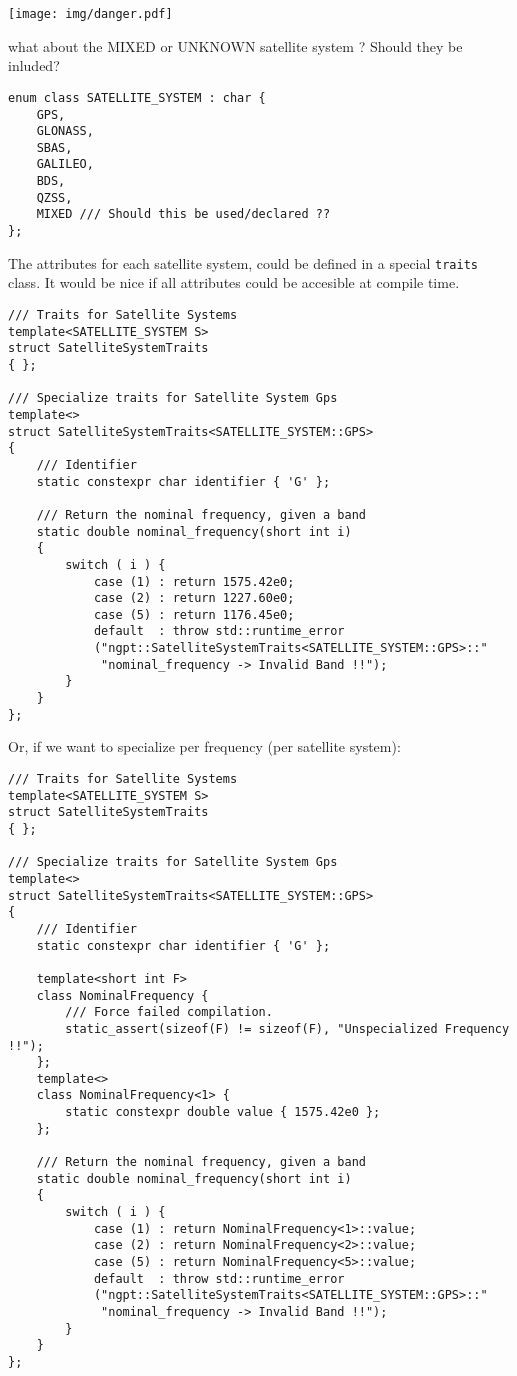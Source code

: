 \documentclass{article}
\newcommand{\alertwarningbox}[1]{
    \centering
    \colorbox{warningbackground}{\parbox{400pt} {
            \vskip 10pt
            \begin{floatingfigure}[l]{50pt}
                \texttt{[image: img/danger.pdf]}
            \end{floatingfigure}
            #1
            \vskip 10pt
        }
    }
}
\begin{document}
\alertwarningbox{what about the MIXED or UNKNOWN satellite system ? Should they be
inluded?}

\begin{lstlisting}
enum class SATELLITE_SYSTEM : char {
    GPS,
    GLONASS,
    SBAS,
    GALILEO,
    BDS,
    QZSS,
    MIXED /// Should this be used/declared ??
};
\end{lstlisting}

The attributes for each satellite system, could be defined in a special \texttt{traits} class.
It would be nice if all attributes could be accesible at compile time.
\begin{lstlisting}
/// Traits for Satellite Systems
template<SATELLITE_SYSTEM S>
struct SatelliteSystemTraits
{ };

/// Specialize traits for Satellite System Gps
template<>
struct SatelliteSystemTraits<SATELLITE_SYSTEM::GPS>
{
    /// Identifier
    static constexpr char identifier { 'G' };
    
    /// Return the nominal frequency, given a band
    static double nominal_frequency(short int i)
    {
        switch ( i ) {
            case (1) : return 1575.42e0;
            case (2) : return 1227.60e0;
            case (5) : return 1176.45e0;
            default  : throw std::runtime_error
            ("ngpt::SatelliteSystemTraits<SATELLITE_SYSTEM::GPS>::"
             "nominal_frequency -> Invalid Band !!");
        }
    }
};
\end{lstlisting}

Or, if we want to specialize per frequency (per satellite system): 
\begin{lstlisting}
/// Traits for Satellite Systems
template<SATELLITE_SYSTEM S>
struct SatelliteSystemTraits
{ };

/// Specialize traits for Satellite System Gps
template<>
struct SatelliteSystemTraits<SATELLITE_SYSTEM::GPS>
{
    /// Identifier
    static constexpr char identifier { 'G' };
    
    template<short int F>
    class NominalFrequency {
        /// Force failed compilation.
        static_assert(sizeof(F) != sizeof(F), "Unspecialized Frequency !!"); 
    };
    template<>
    class NominalFrequency<1> {
        static constexpr double value { 1575.42e0 };
    };
    
    /// Return the nominal frequency, given a band
    static double nominal_frequency(short int i)
    {
        switch ( i ) {
            case (1) : return NominalFrequency<1>::value;
            case (2) : return NominalFrequency<2>::value;
            case (5) : return NominalFrequency<5>::value;
            default  : throw std::runtime_error
            ("ngpt::SatelliteSystemTraits<SATELLITE_SYSTEM::GPS>::"
             "nominal_frequency -> Invalid Band !!");
        }
    }
};
\end{lstlisting}
\end{document}

